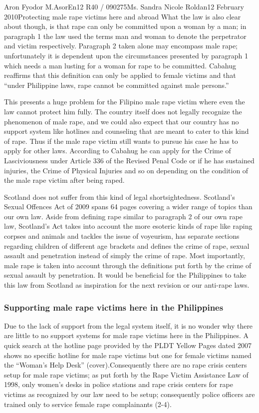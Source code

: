 \documentclass[12pt,letterpaper]{article}
\begin{document}
\begin{mla}{Aron Fyodor M.}{Asor}{En12 R40 / 090275}{Ms. Sandra Nicole Roldan}{12 February 2010}{Protecting male rape victims here and abroad}
What the law is also clear about though, is that rape can only be committed upon a woman by a man; in paragraph 1 the law used the terms man and woman to denote the perpetrator and victim respectively. Paragraph 2 taken alone may encompass male rape; unfortunately it is dependent upon the circumstances presented by paragraph 1 which needs a man lusting for a woman for rape to be committed. Cabahug reaffirms that this definition can only be applied to female victims and that ``under Philippine laws, rape cannot be committed against male persons.''

This presents a huge problem for the Filipino male rape victim where even the law cannot protect him fully. The country itself does not legally recognize the phenomenon of male rape, and we could also expect that our country has no support system like hotlines and counseling that are meant to cater to this kind of rape. Thus if the male rape victim still wants to pursue his case he has to apply for other laws. According to Cabahug he can apply for the Crime of Lasciviousness under Article 336 of the Revised Penal Code or if he has sustained injuries, the Crime of Physical Injuries and so on depending on the condition of the male rape victim after being raped.

%
%
Scotland does not suffer from this kind of legal shortsightedness. Scotland's Sexual Offences Act of 2009 spans 64 pages covering a wider range of topics than our own law. Aside from defining rape similar to paragraph 2 of our own rape law, Scotland's Act takes into account the more esoteric kinds of rape like raping corpses and animals and tackles the issue of voyeurism, has separate sections regarding children of different age brackets and defines the crime of rape, sexual assault and penetration instead of simply the crime of rape. Most importantly, male rape is taken into account through the definitions put forth by the crime of sexual assault by penetration. It would be beneficial for the Philippines to take this law from Scotland as inspiration for the next revision or our anti-rape laws.

%
%
\subsubsection{Supporting male rape victims here in the Philippines}
Due to the lack of support from the legal system itself, it is no wonder why there are little to no support systems for male rape victims here in the Philippines. A quick search at the hotline page provided by the PLDT Yellow Pages dated 2007 shows no specific hotline for male rape victims but one for female victims named the ``Woman's Help Desk'' (cover).Consequently there are no rape crisis centers setup for male rape victims; as put forth by the Rape Victim Assistance Law of 1998, only women's desks in police stations and rape crisis centers for rape victims as recognized by our law need to be setup; consequently police officers are trained only to service female rape complainants (2-4).


\end{mla}
\end{document}
